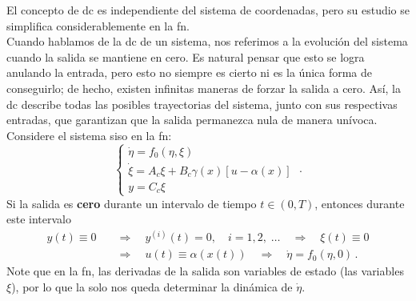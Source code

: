 El concepto de \gls{dc} es independiente del sistema de coordenadas, pero su estudio se simplifica considerablemente en la \gls{fn}.\\

Cuando hablamos de la \gls{dc} de un sistema, nos referimos a la evolución del sistema cuando la salida se mantiene en cero. Es natural pensar que esto se logra anulando la entrada, pero esto no siempre es cierto ni es la única forma de conseguirlo; de hecho, existen infinitas maneras de forzar la salida a cero. Así, la \gls{dc} describe todas las posibles trayectorias del sistema, junto con sus respectivas entradas, que garantizan que la salida permanezca nula de manera unívoca.\\

Considere el sistema \gls{siso} en la \gls{fn}:
\begin{equation*}
	\begin{cases}
		\dot{\eta} = f_0(\eta, \xi)                        \\
		\dot{\xi} = A_c \xi + B_c \gamma(x)[u - \alpha(x)] \\
		y = C_c \xi
	\end{cases} \; .
\end{equation*}
Si la salida es \textbf{cero} durante un intervalo de tiempo $t \in (0, T)$, entonces durante este intervalo
\begin{equation*}
	\begin{aligned}
		y(t) \equiv 0 \quad & \Rightarrow \quad y^{(i)}(t) = 0, \quad i = 1, 2, \; \ldots \quad \Rightarrow \quad \xi(t) \equiv 0 \\
		                    & \Rightarrow \quad u(t) \equiv \alpha(x(t)) \quad \Rightarrow \quad \dot{\eta} = f_0(\eta, 0) \, .
	\end{aligned}
\end{equation*}
Note que en la \gls{fn}, las derivadas de la salida son variables de estado (las variables $\xi$), por lo que la solo nos queda determinar la dinámica de $\dot{\eta}$.\\


